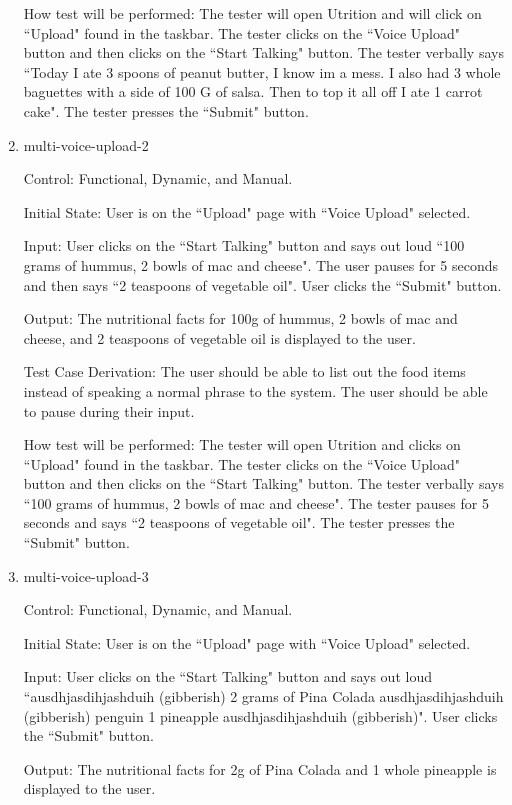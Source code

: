 \documentclass[12pt, titlepage]{article}
\begin{document}
\begin{enumerate}
	How test will be performed: The tester will open Utrition and will click on ``Upload" found in the taskbar. The tester clicks on the ``Voice Upload" button and then clicks on the ``Start Talking" button. The tester verbally says ``Today I ate 3 spoons of peanut butter, I know im a mess. I also had 3 whole baguettes with a side of 100 G of salsa. Then to top it all off I ate 1 carrot cake". The tester presses the ``Submit" button.
	
	\item{multi-voice-upload-2\\}
	
	Control: Functional, Dynamic, and Manual.
	
	Initial State: User is on the ``Upload" page with ``Voice Upload" selected.
	
	Input: User clicks on the ``Start Talking" button and says out loud ``100 grams of hummus, 2 bowls of mac and cheese". The user pauses for 5 seconds and then says ``2 teaspoons of vegetable oil". User clicks the ``Submit" button.
	
	Output: The nutritional facts for 100g of hummus, 2 bowls of mac and cheese, and 2 teaspoons of vegetable oil is displayed to the user.
	
	Test Case Derivation: The user should be able to list out the food items instead of speaking a normal phrase to the system. The user should be able to pause during their input.
	
	How test will be performed: The tester will open Utrition and clicks on ``Upload" found in the taskbar. The tester clicks on the ``Voice Upload" button and then clicks on the ``Start Talking" button. The tester verbally says ``100 grams of hummus, 2 bowls of mac and cheese". The tester pauses for 5 seconds and says ``2 teaspoons of vegetable oil". The tester presses the ``Submit" button.
	
	\item{multi-voice-upload-3\\}
	
	Control: Functional, Dynamic, and Manual.
	
	Initial State: User is on the ``Upload" page with ``Voice Upload" selected.
	
	Input: User clicks on the ``Start Talking" button and says out loud ``ausdhjasdihjashduih (gibberish) 2 grams of Pina Colada ausdhjasdihjashduih (gibberish) penguin 1 pineapple ausdhjasdihjashduih (gibberish)". User clicks the ``Submit" button.
	
	Output: The nutritional facts for 2g of Pina Colada and 1 whole pineapple is displayed to the user.
	

\end{enumerate}
\end{document}

